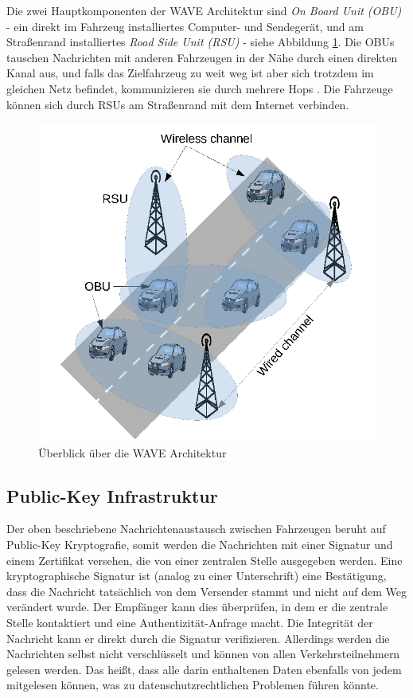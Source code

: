 Die zwei Hauptkomponenten der WAVE Architektur sind \emph{On Board Unit (OBU)} - ein direkt im Fahrzeug installiertes Computer- und Sendegerät, und am Straßenrand installiertes \emph{Road Side Unit (RSU)} - siehe Abbildung \ref{fig:vanet}. Die OBUs tauschen Nachrichten mit anderen Fahrzeugen in der Nähe durch einen direkten Kanal aus, und falls das Zielfahrzeug zu weit weg ist aber sich trotzdem im gleichen Netz befindet, kommunizieren sie durch mehrere Hops \cite{VANET}. Die Fahrzeuge können sich durch RSUs am Straßenrand mit dem Internet verbinden.

\begin{figure}
	\centering
	\includegraphics[width=0.7\linewidth]{images/VANET}
	\caption{Überblick über die WAVE Architektur \cite{VANET}}
	\label{fig:vanet}
\end{figure}


\subsection{Public-Key Infrastruktur}
\label{sec:FirstContentSection:FirstSubSection}

Der oben beschriebene Nachrichtenaustausch zwischen Fahrzeugen beruht auf Public-Key Kryptografie, somit werden die Nachrichten mit einer Signatur und einem Zertifikat versehen, die von einer zentralen Stelle ausgegeben werden. Eine kryptographische Signatur ist (analog zu einer Unterschrift) eine Bestätigung, dass die Nachricht tatsächlich von dem Versender stammt und nicht auf dem Weg verändert wurde. Der Empfänger kann dies überprüfen, in dem er die zentrale Stelle kontaktiert und eine Authentizität-Anfrage macht. Die Integrität der Nachricht kann er direkt durch die Signatur verifizieren. Allerdings werden die Nachrichten selbst nicht verschlüsselt und können von allen Verkehrsteilnehmern gelesen werden. Das heißt, dass alle darin enthaltenen Daten ebenfalls von jedem mitgelesen können, was zu datenschutzrechtlichen Problemen führen könnte. 
 
